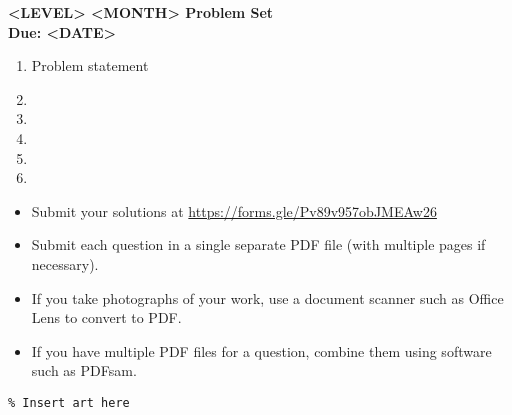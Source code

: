 \documentclass{article}
\begin{document}
\thispagestyle{empty}

\begin{center}
  \textbf{\Large <LEVEL> <MONTH> Problem Set}
  \\ \vspace{1em}
  \textbf{\large Due: <DATE>}
\end{center}

\bigskip

\begin{enumerate}[itemsep=\fill]

\item %
Problem statement


\item %


\item %


\item %


\item %


\item %

\end{enumerate}


\vfill
\small
\begin{itemize}
	\item Submit your solutions at \href{https://forms.gle/Pv89v957obJMEAw26}{https://forms.gle/Pv89v957obJMEAw26}
	\item Submit each question in a single separate PDF file (with multiple pages if necessary).
	\item If you take photographs of your work, use a document scanner such as Office Lens to convert to PDF.
	\item If you have multiple PDF files for a question, combine them using software such as PDFsam.
\end{itemize}

\vfill
\centering
\small
\begin{BVerbatim}
\end{BVerbatim}
\end{document}
